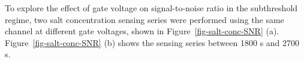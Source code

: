 \documentclass[
  a4paper,
]{scrbook}
\begin{document}
To explore the effect of gate voltage on signal-to-noise ratio in the
subthreshold regime, two salt concentration sensing series were
performed using the same channel at different gate voltages, shown in
Figure~\ref{fig-salt-conc-SNR} (a). Figure~\ref{fig-salt-conc-SNR} (b)
shows the sensing series between 1800 s and 2700 s.

\begin{figure}

\begin{minipage}[t]{0.03\linewidth}

{\centering 


}

\end{minipage}%
%
\begin{minipage}[t]{0.01\linewidth}

{\centering 

~

}

\end{minipage}%
%
\begin{minipage}[t]{0.36\linewidth}

{\centering 

}
\end{minipage}
\end{figure}
\end{document}
